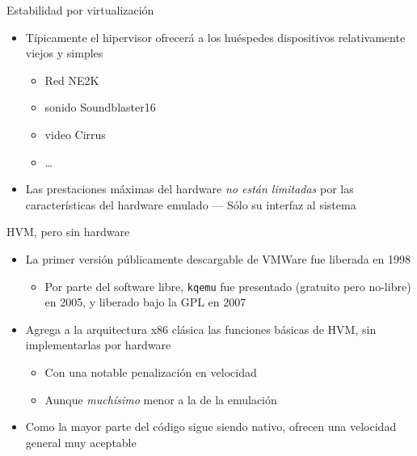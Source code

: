\documentclass[presentation]{beamer}
\begin{document}
\begin{frame}[label={sec:org275db0b}]{Estabilidad por virtualización}
\begin{itemize}
\item Típicamente el hipervisor ofrecerá a los huéspedes dispositivos
relativamente viejos y simples
\begin{itemize}
\item Red NE2K
\item sonido Soundblaster16
\item video Cirrus
\item \ldots{}
\end{itemize}
\item Las prestaciones máximas del hardware \emph{no están limitadas} por las
características del hardware emulado — Sólo su interfaz al sistema
\end{itemize}
\end{frame}

\begin{frame}[label={sec:org210ae3f},fragile]{HVM, pero sin hardware}
 \begin{itemize}
\item La primer versión públicamente descargable de VMWare fue liberada en
1998
\begin{itemize}
\item Por parte del software libre, \texttt{kqemu} fue presentado (gratuito
pero no-libre) en 2005, y liberado bajo la GPL en 2007
\end{itemize}
\item Agrega a la arquitectura x86 clásica las funciones básicas de HVM,
sin implementarlas por hardware
\begin{itemize}
\item Con una notable penalización en velocidad
\item Aunque \emph{muchísimo} menor a la de la emulación
\end{itemize}
\item Como la mayor parte del código sigue siendo nativo, ofrecen una
velocidad general muy aceptable
\end{itemize}
\end{frame}
\end{document}
